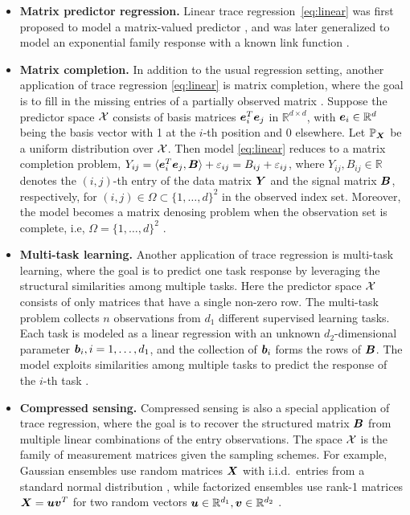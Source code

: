 \documentclass[aos]{imsart}
\theoremstyle{definition}
\begin{document}
\begin{itemize}
\item{\bf Matrix predictor regression.} Linear trace regression~\eqref{eq:linear} was first proposed to model a matrix-valued predictor \citep{zhou2014regularized, wang2014network}, and was later generalized to model an exponential family response with a known link function \citep{wang2017generalized, fan2019generalized}. 
\smallskip

\item {\bf Matrix completion.} In addition to the usual regression setting, another application of trace regression \eqref{eq:linear} is matrix completion, where the goal is to fill in the missing entries of a partially observed matrix \citep{Cai2016}. Suppose the predictor space $\mathcal{X}$ consists of basis matrices $\bm{e}^T_i\bm{e}_j$ in $\mathbb{R}^{d\times d}$, with $\bm{e}_i\in\mathbb{R}^{d}$ being the basis vector with 1 at the $i$-th position and 0 elsewhere. Let $\mathbb{P}_{\bm X}$ be a uniform distribution over $\mathcal{X}$. Then model \eqref{eq:linear} reduces to a matrix completion problem, $Y_{ij}=\langle \bm{e}^T_i \bm{e}_j,\bm B \rangle +\varepsilon_{ij}= B_{ij}+\varepsilon_{ij}$, where $Y_{ij}, B_{ij}\in\mathbb{R}$ denotes the $(i,j)$-th entry of the data matrix $\bm Y$ and the signal matrix $\bm B$, respectively, for $(i,j) \in \Omega\subset\{1,\ldots,d\}^2$ in the observed index set. Moreover, the model becomes a matrix denosing problem when the observation set is complete, i.e, $\Omega=\{1,\ldots,d\}^2$ \citep{Ma2016}. 
\smallskip

\item {\bf Multi-task learning.} Another application of trace regression is multi-task learning, where the goal is to predict one task response by leveraging the structural similarities among multiple tasks. Here the predictor space $\mathcal{X}$ consists of only matrices that have a single non-zero row. The multi-task problem collects $n$ observations from $d_1$ different supervised learning tasks. Each task is modeled as a linear regression with an unknown $d_2$-dimensional parameter $\bm{b}_i, i=1,\ldots,d_1$, and the collection of $\bm{b}_i$ forms the rows of $\bm B$. The model exploits similarities among multiple tasks to predict the response of the $i$-th task \citep{caruana1997multitask,fan2019generalized}. 
\smallskip

\item {\bf Compressed sensing.} Compressed sensing is also a special application of trace regression, where the goal is to recover the structured matrix $\bm B$ from multiple linear combinations of the entry observations. The space $\mathcal{X}$ is the family of measurement matrices given the sampling schemes. For example, Gaussian ensembles use random matrices $\bm X$ with i.i.d.\ entries from a standard normal distribution \citep{candes2011tight}, while factorized ensembles use rank-1 matrices $\bm X=\bm{u}\bm{v}^T$ for two random vectors $\bm{u}\in\mathbb{R}^{d_1}, \bm{v}\in\mathbb{R}^{d_2}$ \cite{recht2010guaranteed}.
\end{itemize}
\end{document}
